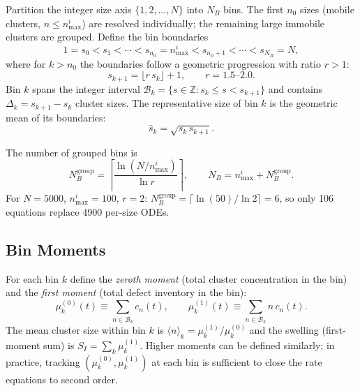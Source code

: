 Partition the integer size axis $\{1, 2, \ldots, N\}$ into $N_B$ bins.
The first $n_0$ sizes (mobile clusters, $n \leq n_{\max}^i$) are
resolved individually; the remaining large immobile clusters are
grouped. Define the bin boundaries
\begin{equation}\label{eq:bin_boundaries}
    1 = s_0 < s_1 < \cdots < s_{n_0} = n_{\max}^i
    < s_{n_0+1} < \cdots < s_{N_B} = N,
\end{equation}
where for $k > n_0$ the boundaries follow a geometric progression with
ratio $r > 1$:
\begin{equation}\label{eq:bin_ratio}
    s_{k+1} = \lfloor r\,s_k \rfloor + 1,
    \qquad r = 1.5\text{--}2.0.
\end{equation}
Bin $k$ spans the integer interval $\mathcal{B}_k = \{s \in \mathbb{Z}
: s_k \leq s < s_{k+1}\}$ and contains $\Delta_k = s_{k+1} - s_k$
cluster sizes. The representative size of bin $k$ is the geometric
mean of its boundaries:
\begin{equation}\label{eq:shat}
    \hat{s}_k = \sqrt{s_k\,s_{k+1}}.
\end{equation}

The number of grouped bins is
\begin{equation}\label{eq:NB}
    N_B^{\mathrm{group}} = \left\lceil
        \frac{\ln(N/n_{\max}^i)}{\ln r}
    \right\rceil,
    \qquad
    N_B = n_{\max}^i + N_B^{\mathrm{group}}.
\end{equation}
For $N = 5000$, $n_{\max}^i = 100$, $r = 2$: $N_B^{\mathrm{group}}
= \lceil \ln(50)/\ln 2 \rceil = 6$, so only 106 equations replace
4900 per-size ODEs.

\subsection{Bin Moments}
\label{sec:bin_moments}

For each bin $k$ define the \emph{zeroth moment} (total cluster
concentration in the bin) and the \emph{first moment} (total defect
inventory in the bin):
\begin{equation}\label{eq:bin_moments_def}
    \mu_k^{(0)}(t) \equiv \sum_{n \in \mathcal{B}_k} c_n(t),
    \qquad
    \mu_k^{(1)}(t) \equiv \sum_{n \in \mathcal{B}_k} n\,c_n(t).
\end{equation}
The mean cluster size within bin $k$ is
$\langle n \rangle_k = \mu_k^{(1)}/\mu_k^{(0)}$ and the swelling
(first-moment sum) is $S_I = \sum_k \mu_k^{(1)}$. Higher moments
can be defined similarly; in practice, tracking $(\mu_k^{(0)},
\mu_k^{(1)})$ at each bin is sufficient to close the rate equations
to second order.

